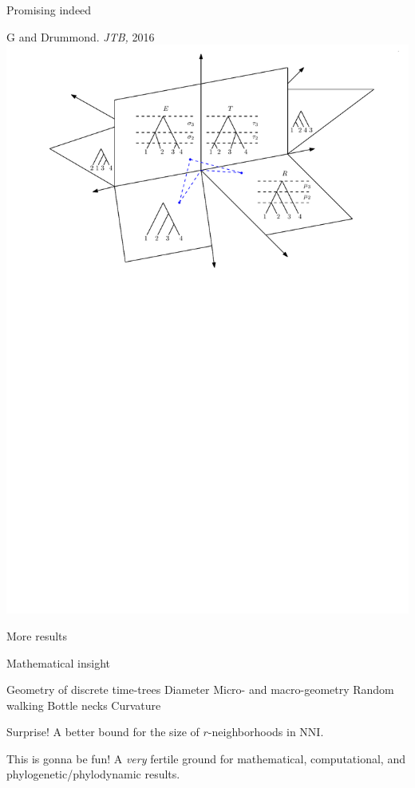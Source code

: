 \documentclass{beamer}
\newcommand{\nni}{\mathrm{NNI}}
\theoremstyle{example}
\begin{document}
\begin{frame}{Promising indeed}
\begin{block}{G and Drummond. \emph{JTB,} 2016}
\includegraphics[width=\framewidth]{tauSpace}
\end{block}
\end{frame}

\begin{frame}{More results}
\begin{block}{Mathematical insight}
\begin{outline}
\1 Geometry of discrete time-trees
	\2 Diameter
	\2 Micro- and macro-geometry
\1 Random walking
	\2 Bottle necks
	\2 Curvature
\end{outline}
\end{block}

\pause

\begin{block}{Surprise!}
A better bound for the size of $r$-neighborhoods in $\nni$.
\end{block}

\pause

\begin{block}{This is gonna be fun!}
A \emph{very} fertile ground for mathematical, computational, and phylogenetic/phylodynamic results.
\end{block}
\end{frame}
\end{document}
